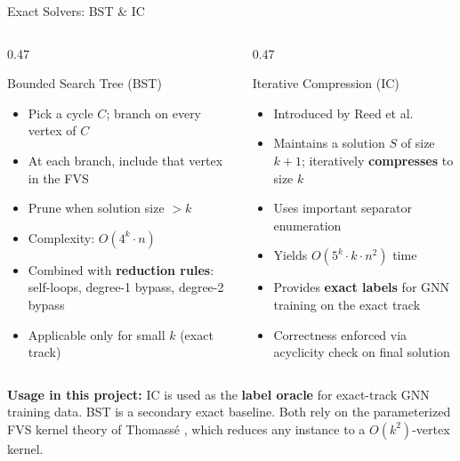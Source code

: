 \documentclass[aspectratio=169,10pt]{beamer}
\renewcommand{\footnotesize}{\tiny}
\begin{document}
\begin{frame}{Exact Solvers: BST \& IC}
  \begin{columns}[T]
    \begin{column}{0.47\textwidth}
      \begin{block}{Bounded Search Tree (BST)}
        \begin{itemize}\setlength\itemsep{2pt}
          \item Pick a cycle $C$; branch on every vertex of $C$
          \item At each branch, include that vertex in the FVS
          \item Prune when solution size $> k$
          \item Complexity: $O(4^k \cdot n)$ \cite{becker2000}
          \item Combined with \textbf{reduction rules}:
            self-loops, degree-1 bypass, degree-2 bypass
          \item Applicable only for small $k$ (exact track)
        \end{itemize}
      \end{block}
    \end{column}
    \begin{column}{0.47\textwidth}
      \begin{block}{Iterative Compression (IC)}
        \begin{itemize}\setlength\itemsep{2pt}
          \item Introduced by Reed et al.\ \cite{reed2004}
          \item Maintains a solution $S$ of size $k+1$;
            iteratively \textbf{compresses} to size $k$
          \item Uses important separator enumeration
          \item Yields $O(5^k \cdot k \cdot n^2)$ time \cite{cygan2015}
          \item Provides \textbf{exact labels} for
            GNN training on the exact track
          \item Correctness enforced via acyclicity
            check on final solution
        \end{itemize}
      \end{block}
    \end{column}
  \end{columns}
  \vspace{4pt}
  \begin{tcolorbox}[orangebox,fontupper=\footnotesize]
    \textbf{Usage in this project:} IC is used as the \textbf{label oracle} for
    exact-track GNN training data. BST is a secondary exact baseline.
    Both rely on the parameterized FVS kernel theory of Thomassé \cite{thomasse2010},
    which reduces any instance to a $O(k^2)$-vertex kernel.
  \end{tcolorbox}
\end{frame}
\end{document}
